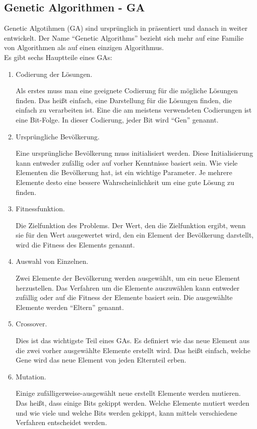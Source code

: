 \documentclass[twoside,twocolumn]{article}
\begin{document}
\subsection{Genetic Algorithmen - GA}
Genetic Algotihmen (GA) sind ursprünglich in \cite{holland_ga} präsentiert und danach in \cite{goldberg_ga} weiter entwickelt. Der Name ``Genetic Algorithms'' bezieht sich mehr auf eine Familie von Algorithmen als auf einen einzigen Algorithmus.\\
Es gibt sechs Hauptteile eines GAs:

\begin{enumerate}
\item{Codierung der Lösungen.}\par
Als erstes muss man eine geeignete Codierung für die mögliche Lösungen finden. Das heißt einfach, eine Darstellung für die Lösungen finden, die einfach zu verarbeiten ist. Eine die am meistens verwendeten Codierungen ist eine Bit-Folge. In dieser Codierung, jeder Bit wird ``Gen'' genannt.
\item{Ursprüngliche Bevölkerung.}\par
Eine ursprüngliche Bevölkerung muss initialisiert werden. Diese Initialisierung kann entweder zufällig oder auf vorher Kenntnisse basiert sein. Wie viele Elementen die Bevölkerung hat, ist ein wichtige Parameter. Je mehrere Elemente desto eine bessere Wahrscheinlichkeit um eine gute Lösung zu finden.
\item{Fitnessfunktion.}\par
Die Zielfunktion des Problems. Der Wert, den die Zielfunktion ergibt, wenn sie für den Wert ausgewertet wird, den ein Element der Bevölkerung darstellt, wird die Fitness des Elements genannt.
\item{Auswahl von Einzelnen.}\par
Zwei Elemente der Bevölkerung werden ausgewählt, um ein neue Element herzustellen. Das Verfahren um die Elemente auszuwählen kann entweder zufällig oder auf die Fitness der Elemente basiert sein. Die ausgewählte Elemente werden ``Eltern'' genannt.
\item{Crossover.}\par
Dies ist das wichtigste Teil eines GAs. Es definiert wie das neue Element aus die zwei vorher ausgewählte Elemente erstellt wird. Das heißt einfach, welche Gene wird das neue Element von jeden Elternteil erben.
\item{Mutation.}\par
Einige zufälligerweise-ausgewählt neue erstellt Elemente werden mutieren. Das heißt, dass einige Bits gekippt werden. Welche Elemente mutiert werden und wie viele und welche Bits werden gekippt, kann mittels verschiedene Verfahren entscheidet werden.
\end{enumerate}
\end{document}
